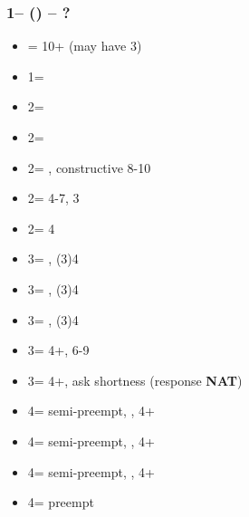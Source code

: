 \documentclass[12pt, a4paper]{article}
\begin{document}
\subsubsection*{1\spades -- (\dbl) -- ?}
\begin{itemize}
    \item \rdbl = 10+ (may have 3\spades)
    \item 1\nt = \trsf{ 2\clubs}
    \item 2\clubs = \trsf{2\diams}
    \item 2\diams = \trsf{2\hearts}
    \item 2\hearts = \trsf{2\spades}, constructive 8-10
    \item 2\spades = 4-7, 3\spades
    \item 2\nt = 4\spades \inv
    \item 3\clubs = \clubs, (3)4\spades \invp
    \item 3\diams = \diams, (3)4\spades \invp
    \item 3\hearts = \hearts, (3)4\spades \invp
    \item 3\spades = 4+\spades, 6-9
    \item 3\nt =  4+\spades, ask shortness (response \small{\textbf{NAT}}) \imp
    \item 4\clubs = semi-preempt, \clubs, 4+\spades
    \item 4\diams = semi-preempt, \diams, 4+\spades
    \item 4\hearts = semi-preempt, \hearts, 4+\spades
    \item 4\spades = preempt
\end{itemize}

\end{document}
